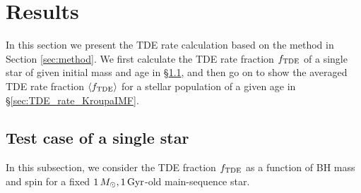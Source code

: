 \documentclass[useAMS,usenatbib]{mn2e}
\def\msun{M_{\rm \odot}}
\def\mstar{M_*}
\def\mBH{M_{\rm BH}}
\def\Gammalc{\Gamma_{\rm lc}}
\def\fTDE{f_{\rm TDE}}
\def\Gammaratio{\Gamma_{\rm ratio}}
\def\Gyr{{\rm Gyr}}
\def\note{\textcolor{magenta}}
\newcommand{\lara}[1]{\left\langle{#1}\right\rangle}
\begin{document}
\section{Results}\label{sec:result}


In this section we present the TDE rate calculation based on the method in Section \ref{sec:method}.
We first calculate the TDE rate fraction $\fTDE$ of a single star of given initial mass and age in \S \ref{sec:single_star}, and then go on to show the averaged TDE rate fraction $\lara{\fTDE}$ for a stellar population of a given age in \S \ref{sec:TDE_rate_KroupaIMF}.


\subsection{Test case of a single star}\label{sec:single_star}

In this subsection, we consider the TDE fraction $\fTDE$ as a function of BH mass and spin for a fixed $1\,\msun,1\,\Gyr$-old main-sequence star.
\end{document}
